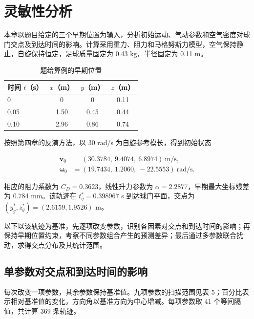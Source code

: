 \documentclass[12pt,letterpaper]{article}
\begin{document}
\setcounter{section}{4}
\setcounter{table}{3}
\setcounter{figure}{10}
\section{灵敏性分析}

本章以题目给定的三个早期位置为输入，分析初始运动、气动参数和空气密度对球门交点及到达时间的影响。计算采用重力、阻力和马格努斯力模型，空气保持静止，自旋保持恒定，足球质量固定为 0.43 kg，半径固定为 0.11 m。


\begin{table}[H]
\centering
\small
\renewcommand{\arraystretch}{1.16}
\caption{题给算例的早期位置}
\begin{tabular}{lccc}
\toprule
时间 $t$（s） & $x$（m） & $y$（m） & $z$（m）\\
\midrule
0 & 0 & 0 & 0.11\\
0.05 & 1.50 & 0.45 & 0.44\\
0.10 & 2.96 & 0.86 & 0.74\\
\bottomrule
\end{tabular}
\end{table}

按照第四章的反演方法，以 30 rad/s 为自旋参考模长，得到初始状态


\begin{equation*}
\begin{aligned}
\boldsymbol v_0&=(30.3784,\ 9.4074,\ 6.8974)\ \mathrm{m/s},\\
\boldsymbol\omega_0&=(19.7434,\ 1.2060,\ -22.5553)\ \mathrm{rad/s}.
\end{aligned}
\end{equation*}

相应的阻力系数为 $C_D=0.3623$，线性升力参数为 $\alpha=2.2877$，早期最大坐标残差为 0.784 mm。该轨迹在 $t_g^*=0.398967$ s 到达球门平面，交点为 $(y_g^*,z_g^*)=(2.6159,1.9526)$ m。


以下以该轨迹为基准，先逐项改变参数，识别各因素对交点和到达时间的影响；再保持早期位置约束，考察不同参数组合产生的预测差异；最后通过多参数联合扰动，求得交点分布及其统计范围。


\FloatBarrier
\subsection{单参数对交点和到达时间的影响}

每次改变一项参数，其余参数保持基准值。九项参数的扫描范围见表 5；百分比表示相对基准值的变化，方向角以基准方向为中心增减。每项参数取 41 个等间隔值，共计算 369 条轨迹。
\end{document}
